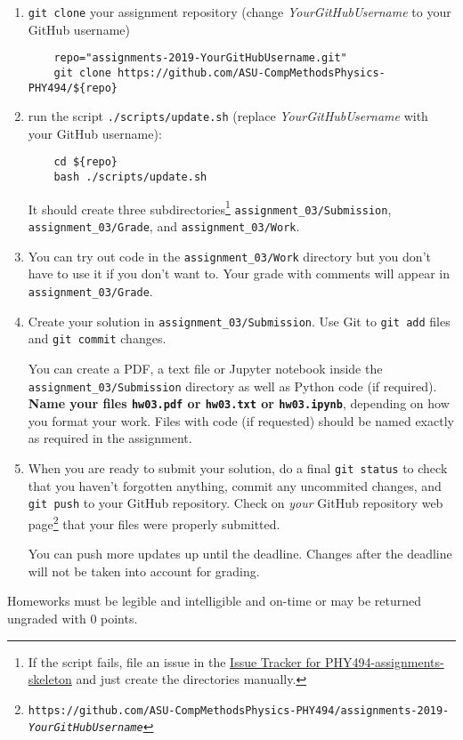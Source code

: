 \documentclass[letterpaper]{scrartcl}
\newcommand{\anumber}{3}
\newcommand{\anum}{0\anumber}
\begin{document}
\begin{enumerate}
\item \texttt{git clone} your assignment repository (change
  \emph{YourGitHubUsername} to your GitHub username)
  \begin{verbatim}
    repo="assignments-2019-YourGitHubUsername.git" 
    git clone https://github.com/ASU-CompMethodsPhysics-PHY494/${repo}
  \end{verbatim}
\item run the script
  \texttt{./scripts/update.sh} (replace \emph{YourGitHubUsername} with
  your GitHub username):
  \begin{verbatim}
    cd ${repo} 
    bash ./scripts/update.sh
  \end{verbatim}
  It should create three subdirectories\footnote{If the script fails,
    file an issue in the
    \href{https://github.com/ASU-CompMethodsPhysics-PHY494/PHY494-assignments-skeleton/issues}{Issue
      Tracker for PHY494-assignments-skeleton} and just create the
    directories manually.} \texttt{assignment\_\anum/Submission},
  \texttt{assignment\_\anum/Grade}, and
  \texttt{assignment\_\anum/Work}.
\item You can try out code in the \texttt{assignment\_\anum/Work}
  directory but you don't have to use it if you don't want to. Your
  grade with comments will appear in
  \texttt{assignment\_\anum/Grade}.
\item Create your solution in
  \texttt{assignment\_\anum/Submission}. Use Git to \texttt{git
    add} files and \texttt{git commit} changes.

  You can create a PDF, a text file or Jupyter notebook inside the
  \texttt{assignment\_\anum/Submission} directory as well as Python
  code (if required). \textbf{Name your files \texttt{hw\anum.pdf} or
    \texttt{hw\anum.txt} or \texttt{hw\anum.ipynb}}, depending on how
  you format your work. Files with code (if requested) should be named
  exactly as required in the assignment.
\item When you are ready to submit your solution, do a final
  \texttt{git status} to check that you haven't forgotten anything,
  commit any uncommited changes, and \texttt{git push} to your GitHub
  repository. Check on \emph{your} GitHub repository web
  page\footnote{\texttt{https://github.com/ASU-CompMethodsPhysics-PHY494/assignments-2019-\emph{YourGitHubUsername}}}
  that your files were properly submitted.

  You can push more updates up until the deadline. Changes after the
  deadline will not be taken into account for grading.
\end{enumerate}
Homeworks must be legible and intelligible and on-time or may  be
returned ungraded with 0 points.
\end{document}
